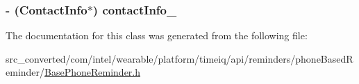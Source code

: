 \subsubsection[{contact\+Info\+\_\+}]{\setlength{\rightskip}{0pt plus 5cm}-\/ ({\bf Contact\+Info}$\ast$) contact\+Info\+\_\+}\label{interface_base_phone_reminder___base_phone_based_reminder_builder_af3648db8eee1351063af8e8078269381}


The documentation for this class was generated from the following file\+:\begin{DoxyCompactItemize}
\item 
src\+\_\+converted/com/intel/wearable/platform/timeiq/api/reminders/phone\+Based\+Reminder/\hyperlink{_base_phone_reminder_8h}{Base\+Phone\+Reminder.\+h}\end{DoxyCompactItemize}
